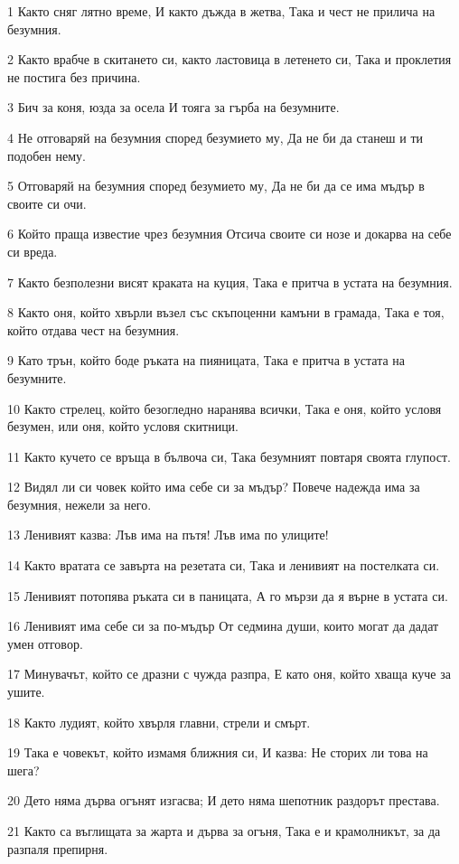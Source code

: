 \par 1 Както сняг лятно време, И както дъжда в жетва, Така и чест не прилича на безумния.
\par 2 Както врабче в скитането си, както ластовица в летенето си, Така и проклетия не постига без причина.
\par 3 Бич за коня, юзда за осела И тояга за гърба на безумните.
\par 4 Не отговаряй на безумния според безумието му, Да не би да станеш и ти подобен нему.
\par 5 Отговаряй на безумния според безумието му, Да не би да се има мъдър в своите си очи.
\par 6 Който праща известие чрез безумния Отсича своите си нозе и докарва на себе си вреда.
\par 7 Както безполезни висят краката на куция, Така е притча в устата на безумния.
\par 8 Както оня, който хвърли възел със скъпоценни камъни в грамада, Така е тоя, който отдава чест на безумния.
\par 9 Като трън, който боде ръката на пияницата, Така е притча в устата на безумните.
\par 10 Както стрелец, който безогледно наранява всички, Така е оня, който условя безумен, или оня, който условя скитници.
\par 11 Както кучето се връща в бълвоча си, Така безумният повтаря своята глупост.
\par 12 Видял ли си човек който има себе си за мъдър? Повече надежда има за безумния, нежели за него.
\par 13 Ленивият казва: Лъв има на пътя! Лъв има по улиците!
\par 14 Както вратата се завърта на резетата си, Така и ленивият на постелката си.
\par 15 Ленивият потопява ръката си в паницата, А го мързи да я върне в устата си.
\par 16 Ленивият има себе си за по-мъдър От седмина души, които могат да дадат умен отговор.
\par 17 Минувачът, който се дразни с чужда разпра, Е като оня, който хваща куче за ушите.
\par 18 Както лудият, който хвърля главни, стрели и смърт.
\par 19 Така е човекът, който измамя ближния си, И казва: Не сторих ли това на шега?
\par 20 Дето няма дърва огънят изгасва; И дето няма шепотник раздорът престава.
\par 21 Както са въглищата за жарта и дърва за огъня, Така е и крамолникът, за да разпаля препирня.
